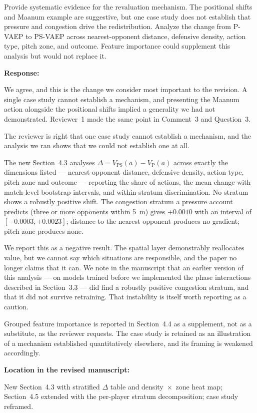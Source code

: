 \documentclass[11pt,a4paper]{article}
\newcommand{\newwork}[1]{\textcolor{statusnew}{#1}}
\newcommand{\response}[2]{%
  \begin{responsebox}
  \textbf{Response:}

  #1
  \end{responsebox}
  \begin{locationbox}
  \textbf{Location in the revised manuscript:}

  #2
  \end{locationbox}
}
\begin{document}
\begin{reviewbox}[Comment 5]
Provide systematic evidence for the revaluation mechanism. The positional shifts and Maanum example are suggestive, but one case study does not establish that pressure and congestion drive the redistribution. Analyze the change from P-VAEP to PS-VAEP across nearest-opponent distance, defensive density, action type, pitch zone, and outcome. Feature importance could supplement this analysis but would not replace it.
\end{reviewbox}
\response{We agree, and this is the change we consider most important to the revision. A single case study cannot establish a mechanism, and presenting the Maanum action alongside the positional shifts implied a generality we had not demonstrated. Reviewer~1 made the same point in Comment~3 and Question~3.

The reviewer is right that one case study cannot establish a mechanism, and the analysis we ran shows that we could not establish one at all.

The new Section~4.3 analyses $\Delta = V_{\mathrm{PS}}(a) - V_{\mathrm{P}}(a)$ across exactly the dimensions listed --- nearest-opponent distance, defensive density, action type, pitch zone and outcome --- reporting the share of actions, the mean change with match-level bootstrap intervals, and within-stratum discrimination. No stratum shows a robustly positive shift. The congestion stratum a pressure account predicts (three or more opponents within 5~m) gives $+0.0010$ with an interval of $[-0.0003, +0.0023]$; distance to the nearest opponent produces no gradient; pitch zone produces none.

We report this as a negative result. The spatial layer demonstrably reallocates value, but we cannot say which situations are responsible, and the paper no longer claims that it can. We note in the manuscript that an earlier version of this analysis --- on models trained before we implemented the phase interactions described in Section~3.3 --- did find a robustly positive congestion stratum, and that it did not survive retraining. That instability is itself worth reporting as a caution.

\newwork{Grouped feature importance is reported in Section~4.4 as a supplement, not as a substitute, as the reviewer requests. The case study is retained as an illustration of a mechanism established quantitatively elsewhere, and its framing is weakened accordingly.}}{New Section~4.3 with stratified $\Delta$ table and density~$\times$~zone heat map; Section~4.5 extended with the per-player stratum decomposition; case study reframed.}
\end{document}
